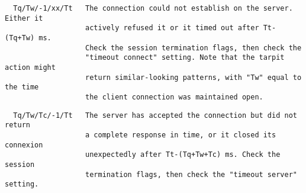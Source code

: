 \begin{verbatim}
  Tq/Tw/-1/xx/Tt   The connection could not establish on the server. Either it
                   actively refused it or it timed out after Tt-(Tq+Tw) ms.
                   Check the session termination flags, then check the
                   "timeout connect" setting. Note that the tarpit action might
                   return similar-looking patterns, with "Tw" equal to the time
                   the client connection was maintained open.
\end{verbatim}

\begin{verbatim}
  Tq/Tw/Tc/-1/Tt   The server has accepted the connection but did not return
                   a complete response in time, or it closed its connexion
                   unexpectedly after Tt-(Tq+Tw+Tc) ms. Check the session
                   termination flags, then check the "timeout server" setting.
\end{verbatim}

